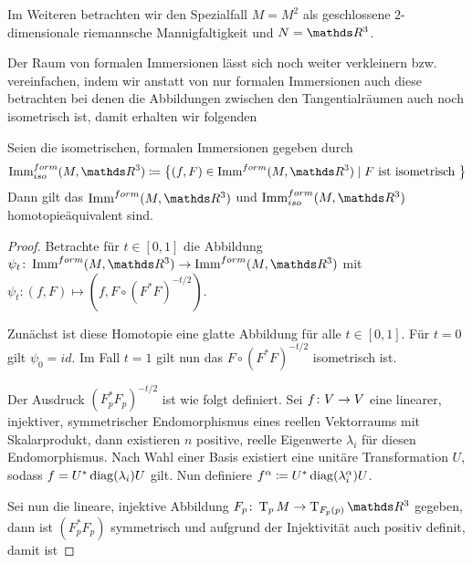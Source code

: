 Im Weiteren betrachten wir den Spezialfall $ M=M^2 $ als geschlossene $ 2 $-dimensionale riemannsche Mannigfaltigkeit und
$ N=\R^3 $.

Der Raum von formalen Immersionen lässt sich noch weiter verkleinern
bzw. vereinfachen, indem wir anstatt von nur formalen Immersionen auch
diese betrachten bei denen die Abbildungen zwischen den
Tangentialräumen auch noch isometrisch ist, damit erhalten wir
folgenden


\begin{Satz}
  Seien die isometrischen, formalen Immersionen gegeben durch
  \begin{gather*}
    \Immfi{M}{\R^3} \coloneqq \set{(f,F) \in \Immf{M}{\R^3}}{F \text{
        ist isometrisch }}
  \end{gather*}
  Dann gilt das $\Immf{M}{\R^3}$ und $\Immfi{M}{\R^3}$
  homotopieäquivalent sind.
	\begin{proof}
          Betrachte für $t \in [0,1]$ die Abbildung
          $\abb{\psi_t}{\Immf{M}{\R^3}}{\Immf{M}{\R^3}}$ mit
          $\psi_t : (f,F) \mapsto (f,F \circ
          (F^{\ast}F)^{-t/2})$.
		
          Zunächst ist diese Homotopie eine glatte Abbildung für alle
          $ t \in [0,1] $. Für $ t=0 $ gilt $ \psi_0 = id $. Im Fall
          $ t=1 $ gilt nun das $ F \circ (F^{\ast}F)^{-t/2} $
          isometrisch ist.
		
          Der Ausdruck $ (F_p^\ast F_p)^{-t/2} $ ist wie folgt
          definiert. Sei $ f \colon V \rightarrow V $ eine linearer, injektiver,
          symmetrischer Endomorphismus eines reellen Vektorraums mit
          Skalarprodukt, dann existieren $ n $ positive, reelle
          Eigenwerte $ \lambda_i $ für diesen Endomorphismus. Nach
          Wahl einer Basis existiert eine unitäre Transformation
          $ U $, sodass $ f = U^\ast \operatorname{diag}(\lambda_i) U $ gilt. Nun
          definiere
          $ f^\alpha \coloneqq U^\ast \operatorname{diag}(\lambda_i^\alpha) U $.
		
          Sei nun die lineare, injektive Abbildung
          $ \abb{F_p}{\tang{p}{M}}{\tang{F_p(p)}{\R^3}} $ gegeben,
          dann ist $ (F_p^\ast F_p) $ symmetrisch und aufgrund der
          Injektivität auch positiv definit, damit ist
		

\end{proof}
\end{Satz}
